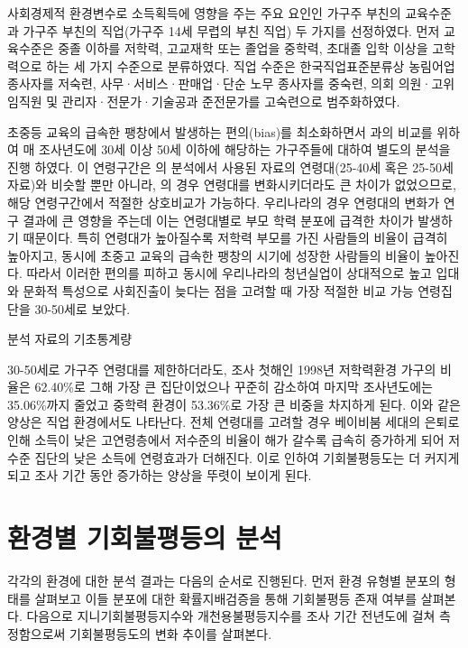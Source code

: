 사회경제적 환경변수로 소득획득에 영향을 주는 주요 요인인 가구주 부친의 교육수준과 가구주 부친의 직업(가구주 14세 무렵의 부친 직업) 두 가지를 선정하였다.
먼저 교육수준은 중졸 이하를 저학력, 고교재학 또는 졸업을 중학력, 초대졸 입학 이상을 고학력으로 하는 세 가지 수준으로 분류하였다.
직업 수준은 한국직업표준분류상 농림어업 종사자를 저숙련, 사무·서비스·판매업·단순 노무 종사자를 중숙련, 의회 의원·고위임직원 및 관리자·전문가·기술공과 준전문가를 고숙련으로 범주화하였다.

초중등 교육의 급속한 팽창에서 발생하는 편의(bias)를 최소화하면서 \citet{letl08}과의 비교를 위하여 매 조사년도에 30세 이상 50세 이하에 해당하는 가구주들에 대하여 별도의 분석을 진행 하였다.
이 연령구간은 \citet{letl08}의 분석에서 사용된 자료의 연령대(25-40세 혹은 25-50세 자료)와 비슷할 뿐만 아니라, \citeauthor{letl08}의 경우 연령대를 변화시키더라도 큰 차이가 없었으므로, 해당 연령구간에서 적절한 상호비교가 가능하다.
우리나라의 경우 연령대의 변화가 연구 결과에 큰 영향을 주는데 이는 연령대별로 부모 학력 분포에 급격한 차이가 발생하기 때문이다.
특히 연령대가 높아질수록 저학력 부모를 가진 사람들의 비율이 급격히 높아지고, 동시에 초중고 교육의 급속한 팽창의 시기에 성장한 사람들의 비율이 높아진다.
따라서 이러한 편의를 피하고 동시에 우리나라의 청년실업이 상대적으로 높고 입대와 문화적 특성으로 사회진출이 늦다는 점을 고려할 때 가장 적절한 비교 가능 연령집단을 30-50세로 보았다.
 
\begin{table}[htbp]
    \centering
    
    \caption{분석 자료의 기초통계량}
    \label{tab:klips_stat_selected}
\end{table}

 30-50세로 가구주 연령대를 제한하더라도, 조사 첫해인 1998년 저학력환경 가구의 비율은 62.40\%로 그해 가장 큰 집단이었으나 꾸준히 감소하여 마지막 조사년도에는 35.06\%까지 줄었고 중학력 환경이 53.36\%로 가장 큰 비중을 차지하게 된다.
 이와 같은 양상은 직업 환경에서도 나타난다.
 전체 연령대를 고려할 경우 베이비붐 세대의 은퇴로 인해 소득이 낮은 고연령층에서 저수준의 비율이 해가 갈수록 급속히 증가하게 되어 저수준 집단의 낮은 소득에 연령효과가 더해진다.
 이로 인하여 기회불평등도는 더 커지게 되고 조사 기간 동안 증가하는 양상을 뚜렷이 보이게 된다.
 
\section{환경별 기회불평등의 분석}

각각의 환경에 대한 분석 결과는 다음의 순서로 진행된다.
 먼저 환경 유형별 분포의 형태를 살펴보고 이들 분포에 대한 확률지배검증을 통해 기회불평등 존재 여부를 살펴본다.
 다음으로 지니기회불평등지수와 개천용불평등지수를 조사 기간 전년도에 걸쳐 측정함으로써 기회불평등도의 변화 추이를 살펴본다.

